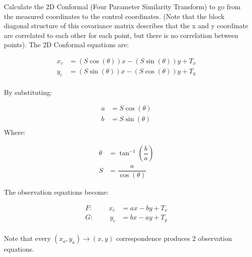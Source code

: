 Calculate the 2D Conformal (Four Parameter Similarity Transform) to go from the measured coordinates to the control coordinates.  (Note that the block diagonal structure of this covariance matrix describes that the x and y coordinate are correlated to each other for each point, but there is no correlation between points).  The 2D Conformal equations are:

\begin{align*}
x_c &= (S\cos(\theta))x - (S\sin(\theta))y + T_x \\
y_c &= (S\sin(\theta))x - (S\cos(\theta))y + T_y \\
\end{align*}

By substituting: 

\begin{align*}
	a &= S\cos(\theta) \\
	b &= S\sin(\theta) \\
\end{align*}
Where:

\begin{align*}
	\theta &= \tan^{-1}(\dfrac{b}{a}) \\
	S &= \dfrac{a}{\cos(\theta)}
\end{align*}

The observation equations become:

\begin{align*}
	F: \hspace{1cm} x_c &= ax - by + T_x \\
	G: \hspace{1cm} y_c &= bx - ay + T_y \\
\end{align*}

Note that every $(x_a,y_a)\rightarrow(x,y)$ correspondence produces 2 observation equations.

